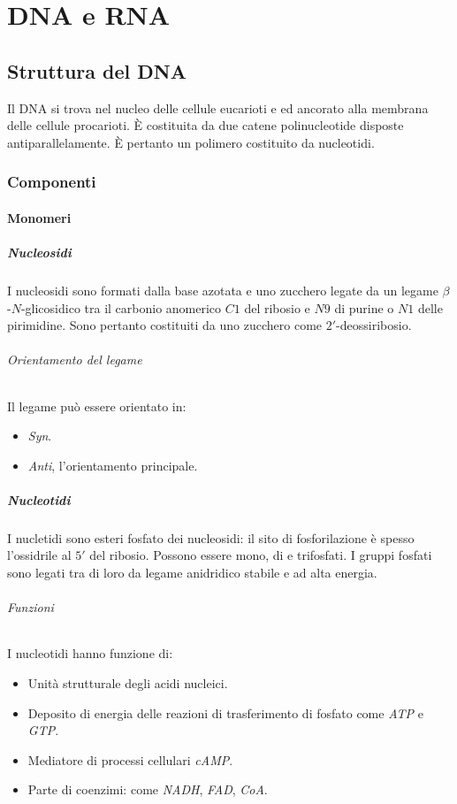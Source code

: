 \chapter{DNA e RNA}
\section{Struttura del DNA}
Il DNA si trova nel nucleo delle cellule eucarioti e ed ancorato alla membrana delle cellule procarioti.
\`E costituita da due catene polinucleotide disposte antiparallelamente. 
\`E pertanto un polimero costituito da nucleotidi.

	\subsection{Componenti}

		\subsubsection{Monomeri}

			\paragraph{Nucleosidi}
			I nucleosidi sono formati dalla base azotata e uno zucchero legate da un legame $\beta$-$N$-glicosidico tra il carbonio anomerico $C1$ del ribosio e $N9$ di purine o $N1$ delle pirimidine.
			Sono pertanto costituiti da uno zucchero come $2'$-deossiribosio.

				\subparagraph{Orientamento del legame}
				Il legame pu\`o essere orientato in:
				\begin{multicols}{2}
					\begin{itemize}
						\item \emph{Syn}.
						\item \emph{Anti}, l'orientamento principale.
					\end{itemize}
				\end{multicols}

			\paragraph{Nucleotidi}
			I nucletidi sono esteri fosfato dei nucleosidi: il sito di fosforilazione \`e spesso l'ossidrile al $5'$ del ribosio.
			Possono essere mono, di e trifosfati.
			I gruppi fosfati sono legati tra di loro da legame anidridico stabile e ad alta energia.
			
				\subparagraph{Funzioni}
				I nucleotidi hanno funzione di:
				\begin{multicols}{2}
					\begin{itemize}
						\item Unit\`a strutturale degli acidi nucleici.
						\item Deposito di energia delle reazioni di trasferimento di fosfato come \emph{ATP} e \emph{GTP}.
						\item Mediatore di processi cellulari \emph{cAMP}.
						\item Parte di coenzimi: come \emph{NADH}, \emph{FAD}, \emph{CoA}.
					\end{itemize}
				\end{multicols}

